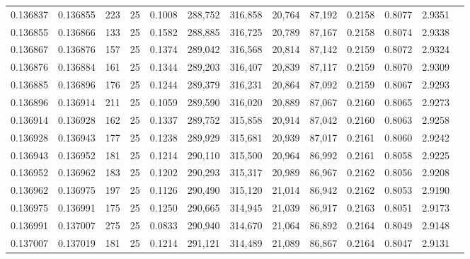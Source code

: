 \begin{tabular}{rrrrrrrrrrrrr}
0.136837 & 0.136855 &   223 &  25 &                                     0.1008 & 288,752 & 316,858 &  20,764 &  87,192 & 0.2158 & 0.8077 & 2.9351 \\
0.136855 & 0.136866 &   133 &  25 &                                     0.1582 & 288,885 & 316,725 &  20,789 &  87,167 & 0.2158 & 0.8074 & 2.9338 \\
0.136867 & 0.136876 &   157 &  25 &                                     0.1374 & 289,042 & 316,568 &  20,814 &  87,142 & 0.2159 & 0.8072 & 2.9324 \\
0.136876 & 0.136884 &   161 &  25 &                                     0.1344 & 289,203 & 316,407 &  20,839 &  87,117 & 0.2159 & 0.8070 & 2.9309 \\
0.136885 & 0.136896 &   176 &  25 &                                     0.1244 & 289,379 & 316,231 &  20,864 &  87,092 & 0.2159 & 0.8067 & 2.9293 \\
0.136896 & 0.136914 &   211 &  25 &                                     0.1059 & 289,590 & 316,020 &  20,889 &  87,067 & 0.2160 & 0.8065 & 2.9273 \\
0.136914 & 0.136928 &   162 &  25 &                                     0.1337 & 289,752 & 315,858 &  20,914 &  87,042 & 0.2160 & 0.8063 & 2.9258 \\
0.136928 & 0.136943 &   177 &  25 &                                     0.1238 & 289,929 & 315,681 &  20,939 &  87,017 & 0.2161 & 0.8060 & 2.9242 \\
0.136943 & 0.136952 &   181 &  25 &                                     0.1214 & 290,110 & 315,500 &  20,964 &  86,992 & 0.2161 & 0.8058 & 2.9225 \\
0.136952 & 0.136962 &   183 &  25 &                                     0.1202 & 290,293 & 315,317 &  20,989 &  86,967 & 0.2162 & 0.8056 & 2.9208 \\
0.136962 & 0.136975 &   197 &  25 &                                     0.1126 & 290,490 & 315,120 &  21,014 &  86,942 & 0.2162 & 0.8053 & 2.9190 \\
0.136975 & 0.136991 &   175 &  25 &                                     0.1250 & 290,665 & 314,945 &  21,039 &  86,917 & 0.2163 & 0.8051 & 2.9173 \\
0.136991 & 0.137007 &   275 &  25 &                                     0.0833 & 290,940 & 314,670 &  21,064 &  86,892 & 0.2164 & 0.8049 & 2.9148 \\
0.137007 & 0.137019 &   181 &  25 &                                     0.1214 & 291,121 & 314,489 &  21,089 &  86,867 & 0.2164 & 0.8047 & 2.9131 \\

\end{tabular}
